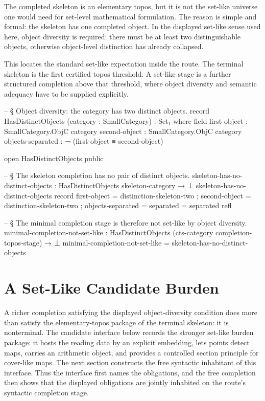 \documentclass[11pt]{article}
\begin{document}
The completed skeleton is an elementary topos, but it is not the
set-like universe one would need for set-level mathematical formulation.
The reason is simple and formal: the skeleton has one completed object.
In the displayed set-like sense used here, object diversity is required:
there must be at least two distinguishable objects, otherwise
object-level distinction has already collapsed.

This locates the standard set-like expectation inside the route.  The
terminal skeleton is the first certified topos threshold.  A set-like
stage is a further structured completion above that threshold, where
object diversity and semantic adequacy have to be supplied explicitly.

\begin{code}
-- § Object diversity: the category has two distinct objects.
record HasDistinctObjects (category : SmallCategory) : Set₁ where
  field
    first-object      : SmallCategory.ObjC category
    second-object     : SmallCategory.ObjC category
    objects-separated : ¬ (first-object ≡ second-object)

open HasDistinctObjects public

-- § The skeleton completion has no pair of distinct objects.
skeleton-has-no-distinct-objects :
  HasDistinctObjects skeleton-category → ⊥
skeleton-has-no-distinct-objects record
  { first-object = distinction-skeleton-two
  ; second-object = distinction-skeleton-two
  ; objects-separated = separated
  } = separated refl

-- § The minimal completion stage is therefore not set-like by object diversity.
minimal-completion-not-set-like :
  HasDistinctObjects (cts-category completion-topos-stage) → ⊥
minimal-completion-not-set-like = skeleton-has-no-distinct-objects
\end{code}

\section{A Set-Like Candidate Burden}

A richer completion satisfying the displayed object-diversity condition
does more than satisfy the elementary-topos package of the terminal
skeleton: it is nonterminal.  The candidate interface below records the
stronger set-like burden package: it hosts the reading data by an
explicit embedding, lets points detect maps, carries an arithmetic
object, and provides a controlled section principle for cover-like maps.
The next section constructs the free syntactic inhabitant of this
interface.  Thus the interface first names the obligations, and the free
completion then shows that the displayed obligations are jointly
inhabited on the route's syntactic completion stage.
\end{document}
